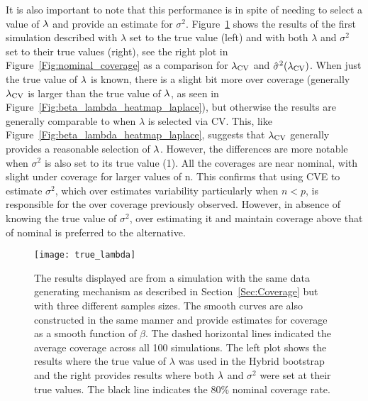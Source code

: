 It is also important to note that this performance is in spite of needing to select a value of $\lambda$ and provide an estimate for $\sigma^2$. Figure~\ref{Fig:true_lambda} shows the results of the first simulation described with $\lambda$ set to the true value (left) and with both $\lambda$ and $\sigma^2$ set to their true values (right), see the right plot in Figure~\ref{Fig:nominal_coverage} as a comparison for $\lambda_{\textrm{CV}}$ and $\hat{\sigma}^2(\lambda_{\textrm{CV}})$. When just the true value of $\lambda$ is known, there is a slight bit more over coverage (generally $\lambda_{\textrm{CV}}$ is larger than the true value of $\lambda$, as seen in Figure~\ref{Fig:beta_lambda_heatmap_laplace}), but otherwise the results are generally comparable to when $\lambda$ is selected via CV. This, like Figure~\ref{Fig:beta_lambda_heatmap_laplace}, suggests that $\lambda_{\textrm{CV}}$ generally provides a reasonable selection of $\lambda$. However, the differences are more notable when $\sigma^2$ is also set to its true value (1). All the coverages are near nominal, with slight under coverage for larger values of n. This confirms that using CVE to estimate $\sigma^2$, which over estimates variability particularly when $n < p$, is responsible for the over coverage previously observed. However, in absence of knowing the true value of $\sigma^2$, over estimating it and maintain coverage above that of nominal is preferred to the alternative.


\begin{figure}[hbtp]
  \begin{center}
  \texttt{[image: true\_lambda]}
  \caption{\label{Fig:true_lambda} The results displayed are from a simulation with the same data generating mechanism as described in Section~\ref{Sec:Coverage} but with three different samples sizes. The smooth curves are also constructed in the same manner and provide estimates for coverage as a smooth function of $\beta$. The dashed horizontal lines indicated the average coverage across all 100 simulations. The left plot shows the results where the true value of $\lambda$ was used in the Hybrid bootstrap and the right provides results where both $\lambda$ and $\sigma^2$ were set at their true values. The black line indicates the 80\% nominal coverage rate.}
  \end{center}
\end{figure}

